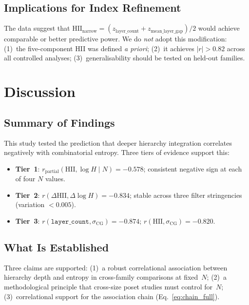 \documentclass[entropy,article,submit,pdftex,moreauthors]{Definitions/mdpi}
\begin{document}
\subsection{Implications for Index Refinement}

The data suggest that $\text{HII}_\text{narrow} = (z_\text{layer\_count} + z_\text{mean\_layer\_gap})/2$ would achieve comparable or better predictive power. We do \emph{not} adopt this modification: (1)~the five-component HII was defined \emph{a priori}; (2)~it achieves $|r| > 0.82$ across all controlled analyses; (3)~generalisability should be tested on held-out families.

\section{Discussion}\label{sec:discussion}

\subsection{Summary of Findings}

This study tested the prediction that deeper hierarchy integration correlates negatively with combinatorial entropy. Three tiers of evidence support this:

\begin{itemize}[nosep]
    \item \textbf{Tier~1}: $r_\text{partial}(\text{HII}, \log H \mid N) = -0.578$; consistent negative sign at each of four $N$ values.
    \item \textbf{Tier~2}: $r(\Delta\text{HII}, \Delta\log H) = -0.834$; stable across three filter stringencies (variation $< 0.005$).
    \item \textbf{Tier~3}: $r(\texttt{layer\_count}, \sigma_\text{CG}) = -0.874$; $r(\text{HII}, \sigma_\text{CG}) = -0.820$.
\end{itemize}

\subsection{What Is Established}

Three claims are supported: (1)~a robust correlational association between hierarchy depth and entropy in cross-family comparisons at fixed~$N$; (2)~a methodological principle that cross-size poset studies must control for~$N$; (3)~correlational support for the association chain (Eq.~\ref{eq:chain_full}).
\end{document}
